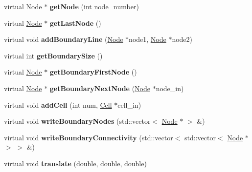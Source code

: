 \begin{CompactItemize}
\item 
\hypertarget{classmknix_1_1FlexBody_35d251c9e9329d388936af27eee5b5ff}{
virtual \hyperlink{classmknix_1_1Node}{Node} $\ast$ \textbf{getNode} (int node\_\-number)}
\label{classmknix_1_1FlexBody_35d251c9e9329d388936af27eee5b5ff}

\item 
\hypertarget{classmknix_1_1FlexBody_0953d49b7f7723176caad1eef9a9e423}{
virtual \hyperlink{classmknix_1_1Node}{Node} $\ast$ \textbf{getLastNode} ()}
\label{classmknix_1_1FlexBody_0953d49b7f7723176caad1eef9a9e423}

\item 
\hypertarget{classmknix_1_1FlexBody_ffa80a48ec87ec8d2946a18dfe05d6d5}{
virtual void \textbf{addBoundaryLine} (\hyperlink{classmknix_1_1Node}{Node} $\ast$node1, \hyperlink{classmknix_1_1Node}{Node} $\ast$node2)}
\label{classmknix_1_1FlexBody_ffa80a48ec87ec8d2946a18dfe05d6d5}

\item 
\hypertarget{classmknix_1_1FlexBody_a851b4ac6624bcd9f62c6b4a7a0ffa14}{
virtual int \textbf{getBoundarySize} ()}
\label{classmknix_1_1FlexBody_a851b4ac6624bcd9f62c6b4a7a0ffa14}

\item 
\hypertarget{classmknix_1_1FlexBody_6d5bfe39a006a9e6fdaf594aa704d7d2}{
virtual \hyperlink{classmknix_1_1Node}{Node} $\ast$ \textbf{getBoundaryFirstNode} ()}
\label{classmknix_1_1FlexBody_6d5bfe39a006a9e6fdaf594aa704d7d2}

\item 
\hypertarget{classmknix_1_1FlexBody_c4df2596467cc839fb10f799e43f363a}{
virtual \hyperlink{classmknix_1_1Node}{Node} $\ast$ \textbf{getBoundaryNextNode} (\hyperlink{classmknix_1_1Node}{Node} $\ast$node\_\-in)}
\label{classmknix_1_1FlexBody_c4df2596467cc839fb10f799e43f363a}

\item 
\hypertarget{classmknix_1_1FlexBody_caeef83ae5cc2e2f2bb99c8de81d9473}{
virtual void \textbf{addCell} (int num, \hyperlink{classmknix_1_1Cell}{Cell} $\ast$cell\_\-in)}
\label{classmknix_1_1FlexBody_caeef83ae5cc2e2f2bb99c8de81d9473}

\item 
\hypertarget{classmknix_1_1FlexBody_47775d5e09cf56522e914d5d7696a2db}{
virtual void \textbf{writeBoundaryNodes} (std::vector$<$ \hyperlink{classmknix_1_1Node}{Node} $\ast$ $>$ \&)}
\label{classmknix_1_1FlexBody_47775d5e09cf56522e914d5d7696a2db}

\item 
\hypertarget{classmknix_1_1FlexBody_96fe50707a8b0c5bbab8c455789d42f5}{
virtual void \textbf{writeBoundaryConnectivity} (std::vector$<$ std::vector$<$ \hyperlink{classmknix_1_1Node}{Node} $\ast$ $>$ $>$ \&)}
\label{classmknix_1_1FlexBody_96fe50707a8b0c5bbab8c455789d42f5}

\item 
\hypertarget{classmknix_1_1FlexBody_4b7462d418b6b9c2e027e7f7e3e5bdce}{
virtual void \textbf{translate} (double, double, double)}
\label{classmknix_1_1FlexBody_4b7462d418b6b9c2e027e7f7e3e5bdce}

\end{CompactItemize}
